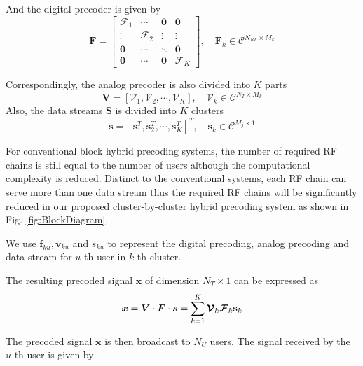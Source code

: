 \documentclass[conference]{IEEEtran}
\begin{document}
And the digital precoder is given by 
\begin{equation}
\bm{F} = 
\begin{bmatrix}
\bm{\mathcal{F}}_1&\cdots & \bm{0}&\bm{0}\\
\vdots & \bm{\mathcal{F}}_2 & \vdots&\vdots \\
\bm{0}&\cdots&\ddots &\bm{0}\\
\bm{0}&\cdots & \bm{0}&\bm{\mathcal{F}}_K
\end{bmatrix}
,\quad
\bm{F}_k \in \mathcal{C}^{N_{RF}\times M_k}
\end{equation}

Correspondingly, the analog precoder is also divided into $K$ parts
\begin{equation}
	\bm{V} = \left[\bm{\mathcal{V}}_1, \bm{\mathcal{V}}_2,\cdots, \bm{\mathcal{V}}_{K}\right], \quad \bm{\mathcal{V}}_k\in \mathcal{C}^{N_T\times M_k}
\end{equation}
Also, the data streams $\bm{S}$ is divided into $K$ clusters
\begin{equation}
\bm{s} = \left[{\mathbf{s}}_1^T, {\mathbf{s}}_2^T,\cdots, \mathbf{s}_{K}^T\right]^T, \quad \mathbf{s}_k\in \mathcal{C}^{M_j\times 1}
\end{equation}

For conventional block hybrid precoding systems, the number of required RF chains is still equal to the number of users although the computational complexity is reduced. Distinct to the conventional systems, each RF chain can serve more than one data stream thus the required RF chains will be significantly reduced in our proposed cluster-by-cluster hybrid precoding system as shown in Fig. \ref{fig:BlockDiagram}.

We use $\bm{f}_{ku}, \bm{v}_{ku}$ and $s_{ku}$ to represent the digital precoding, analog precoding and data stream for $u$-th user in $k$-th cluster.

The resulting precoded signal $\bm x$ of dimension $N_T\times 1$  can be expressed as
\begin{equation}{\label{eq:transx}}
{\bm x} =  \bm{V}\cdot \bm{F}\cdot\bm{s} =\sum_{k=1}^K \bm{\mathcal{V}}_k \bm{\mathcal{F}}_k \mathbf{s}_k
\end{equation}

The precoded signal $\bm x$ is then broadcast to $N_U$ users. The signal received by the $u$-th user is given by
\end{document}
